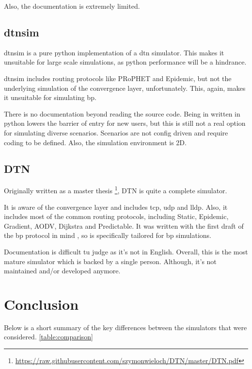 Also, the documentation is extremely limited.

\subsection{dtnsim}

dtnsim is a pure python implementation of a \ac{dtn} simulator. This makes it unsuitable for large scale simulations, as python performance will be a hindrance.

dtnsim includes routing protocols like PRoPHET and Epidemic, but not the underlying simulation of the convergence layer, unfortunately. This, again, makes it unsuitable for simulating \ac{bp}.

There is no documentation beyond reading the source code. Being in written in python lowers the barrier of entry for new users, but this is still not a real option for simulating diverse scenarios.
Scenarios are not config driven and require coding to be defined.
Also, the simulation environment is 2D.

\subsection{DTN}

Originally written as a master thesis \footnote{\url{https://raw.githubusercontent.com/szymonwieloch/DTN/master/DTN.pdf}}, DTN is quite a complete simulator.

It is aware of the convergence layer and includes \ac{tcp}, \ac{udp} and \ac{lldp}. Also, it includes most of the common routing protocols, including Static, Epidemic, Gradient, AODV, Dijkstra and Predictable.
It was written with the first draft of the \ac{bp} protocol in mind \cite{RFC5050}, so is specifically tailored for \ac{bp} simulations.

Documentation is difficult tu judge as it's not in English. Overall, this is the most mature simulator which is backed by a single person. Although, it's not maintained and/or developed anymore.

\section{Conclusion}

Below is a short summary of the key differences between the simulators that were considered. \ref{table:comparison}

